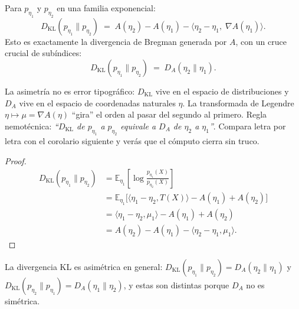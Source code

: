 \begin{theorem}
	Para $p_{\eta_1}$ y $p_{\eta_2}$ en una familia exponencial:
	\[
	D_{\mathrm{KL}}(p_{\eta_1} \| p_{\eta_2}) \;=\; A(\eta_2) - A(\eta_1) - \langle \eta_2 - \eta_1,\; \nabla A(\eta_1) \rangle.
	\]Esto es exactamente la divergencia de Bregman generada por $A$, con un cruce crucial de subíndices:
	\[
	D_{\mathrm{KL}}(p_{\eta_1} \| p_{\eta_2}) \;=\; D_A(\eta_2 \| \eta_1).
	\]
	\begin{remark}
		La asimetría no es error tipográfico: $D_{\mathrm{KL}}$ vive en el espacio de distribuciones y $D_A$ vive en el espacio de coordenadas naturales $\eta$. La transformada de Legendre $\eta \mapsto \mu = \nabla A(\eta)$ ``gira'' el orden al pasar del segundo al primero. Regla nemotécnica: \emph{``$D_{\mathrm{KL}}$ de $p_{\eta_1}$ a $p_{\eta_2}$ equivale a $D_A$ de $\eta_2$ a $\eta_1$''}. Compara letra por letra con el corolario siguiente y verás que el cómputo cierra sin truco.
	\end{remark}
\end{theorem}

\begin{proof}
	\begin{align*}
		D_{\mathrm{KL}}(p_{\eta_1} \| p_{\eta_2})
		&= \mathbb{E}_{\eta_1}\!\left[\log \frac{p_{\eta_1}(X)}{p_{\eta_2}(X)}\right] \\
		&= \mathbb{E}_{\eta_1}\!\Big[\langle \eta_1 - \eta_2, T(X) \rangle - A(\eta_1) + A(\eta_2)\Big] \\
		&= \langle \eta_1 - \eta_2, \mu_1 \rangle - A(\eta_1) + A(\eta_2) \\
		&= A(\eta_2) - A(\eta_1) - \langle \eta_2 - \eta_1, \mu_1 \rangle.
	\end{align*}
\end{proof}

\begin{corollary}[Asimetría de la KL]
	La divergencia KL es asimétrica en general: $D_{\mathrm{KL}}(p_{\eta_1} \| p_{\eta_2}) = D_A(\eta_2 \| \eta_1)$ y $D_{\mathrm{KL}}(p_{\eta_2} \| p_{\eta_1}) = D_A(\eta_1 \| \eta_2)$, y estas son distintas porque $D_A$ no es simétrica.
\end{corollary}

